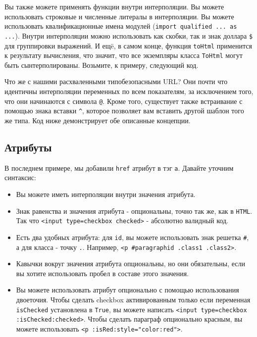 Вы также можете применять функции внутри интерполяции. Вы можете использовать
строковые и численные литералы в интерполяции. Вы можете использовать
квалификационные имена модулей (\lstinline!import qualified ... as ...!). Внутри
интерполяции можно использовать как скобки, так и знак доллара \texttt{\$}
для группировки выражений. И ещë, в самом конце, функция \lstinline!toHtml!
применится к результату вычисления, что значит, что все экземпляры класса
\lstinline!ToHtml! могут быть сынтерполированы. Возьмите, к примеру, следующий код.



Что же с нашими расхваленными типобезопасными URL? Они почти что идентичны
интерполяции переменных по всем показателям, за исключением того, что они
начинаются с символа \texttt{@}. Кроме того, существует также встраивание с помощью
знака вставки \verb'^', которое позволяет вам вставить другой шаблон того же типа.
Код ниже демонстрирует обе описанные концепции.



\subsection{Атрибуты}
В последнем примере, мы добавили \texttt{href} атрибут в тэг \texttt{a}. Давайте
уточним синтаксис:

\begin{itemize}
\item Вы можете иметь интерполяции внутри значения атрибута.
\item Знак равенства и значения атрибута - опциональны, точно так же, как в \texttt{HTML}.
Так что \lstinline!<input type=checkbox checked>! - абсолютно валидный код.
\item Есть два удобных атрибута: для \lstinline!id!, вы можете использовать знак
решетка \texttt{\#}, а для класса - точку \texttt{.}. Например, \lstinline!<p #paragraphid .class1 .class2>!.
\item Кавычки вокруг значения атрибута опциональны, но они обязательны, если вы
хотите использовать пробел в составе этого значения.
\item Вы можете использовать атрибут опционально с помощью использования двоеточия.
Чтобы сделать checkbox активированным только если переменная \lstinline!isChecked!
установлена в \lstinline!True!, вы можете написать
\lstinline!<input type=checkbox :isChecked:checked>!.
Чтобы сделать параграф опционально красным, вы можете использовать
\lstinline!<p :isRed:style="color:red">!.
\end{itemize}


